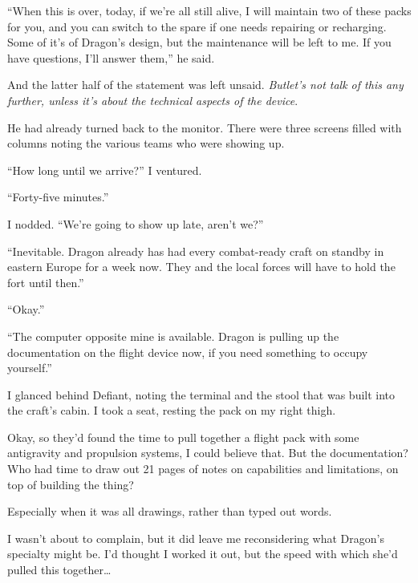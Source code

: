``When this is over, today, if we're all still alive, I will maintain two of these packs for you, and you can switch to the spare if one needs repairing or recharging.  Some of it's of Dragon's design, but the maintenance will be left to me.  If you have questions, I'll answer them,'' he said.



And the latter half of the statement was left unsaid.  \emph{But}\emph{let's not talk of this any further, unless it's about the technical aspects of the device}.



He had already turned back to the monitor.  There were three screens filled with columns noting the various teams who were showing up.



``How long until we arrive?''  I ventured.



``Forty-five minutes.''



I nodded.  ``We're going to show up late, aren't we?''



``Inevitable.  Dragon already has had every combat-ready craft on standby in eastern Europe for a week now.  They and the local forces will have to hold the fort until then.''



``Okay.''



``The computer opposite mine is available.  Dragon is pulling up the documentation on the flight device now, if you need something to occupy yourself.''



I glanced behind Defiant, noting the terminal and the stool that was built into the craft's cabin.  I took a seat, resting the pack on my right thigh.



Okay, so they'd found the time to pull together a flight pack with some antigravity and propulsion systems, I could believe that.  But the documentation?  Who had time to draw out 21 pages of notes on capabilities and limitations, on top of building the thing?



Especially when it was all drawings, rather than typed out words.



I wasn't about to complain, but it did leave me reconsidering what Dragon's specialty might be.  I'd thought I worked it out, but the speed with which she'd pulled this together\ldots



